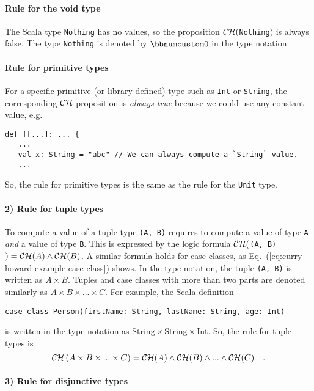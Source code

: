 \paragraph{Rule for the void type}

The Scala type \lstinline!Nothing! has no values, so the proposition
${\cal CH}($\lstinline!Nothing!$)$ is always false. The type \lstinline!Nothing!
is denoted by $\bbnum 0$ in the type notation.

\paragraph{Rule for primitive types}

For a specific primitive (or library-defined) type such as \lstinline!Int!
or \lstinline!String!, the corresponding ${\cal CH}$-proposition
is \emph{always true} because we could use any constant value, e.g.
\begin{lstlisting}
def f[...]: ... {
   ...
   val x: String = "abc" // We can always compute a `String` value.
   ...
\end{lstlisting}
So, the rule for primitive types is the same as the rule for the \lstinline!Unit!
type.

\paragraph{2) Rule for tuple types}

To compute a value of a tuple type \lstinline!(A, B)! requires to
compute a value of type \lstinline!A! \emph{and} a value of type
\lstinline!B!. This is expressed by the logic formula ${\cal CH}($\lstinline!(A, B)!$)={\cal CH}(A)\wedge{\cal CH}(B)$.
A similar formula holds for case classes, as Eq.~(\ref{eq:curry-howard-example-case-class})
shows. In the type notation, the tuple \lstinline!(A, B)! is written
as $A\times B$. Tuples and case classes with more than two parts
are denoted similarly as $A\times B\times...\times C$. For example,
the Scala definition
\begin{lstlisting}
case class Person(firstName: String, lastName: String, age: Int)
\end{lstlisting}
is written in the type notation as $\text{String}\times\text{String}\times\text{Int}$.
So, the rule for tuple types is
\[
{\cal CH}\left(A\times B\times...\times C\right)={\cal CH}(A)\wedge{\cal CH}(B)\wedge...\wedge{\cal CH}(C)\quad.
\]


\paragraph{3) Rule for disjunctive types}

